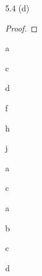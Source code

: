 \documentclass[11pt]{article}
\begin{document}



\begin{ex}{5.4 (d)}
\end{ex}

\begin{proof}
\end{proof}

\begin{ex}{7.5}
\end{ex}

\begin{p}{a}
\end{p}

\begin{p}{c}
\end{p}

\begin{p}{d}
\end{p}

\begin{p}{f}
\end{p}

\begin{p}{h}
\end{p}

\begin{p}{j}
\end{p}

\begin{ex}{13.1}
\end{ex}

\begin{ex}{13.4}
\end{ex}

\begin{p}{a}
\end{p}

\begin{p}{c}
\end{p}


\begin{p}{a}
\end{p}
\begin{p}{b}
\end{p}
\begin{p}{c}
\end{p}
\begin{p}{d}
\end{p}
\end{document}
